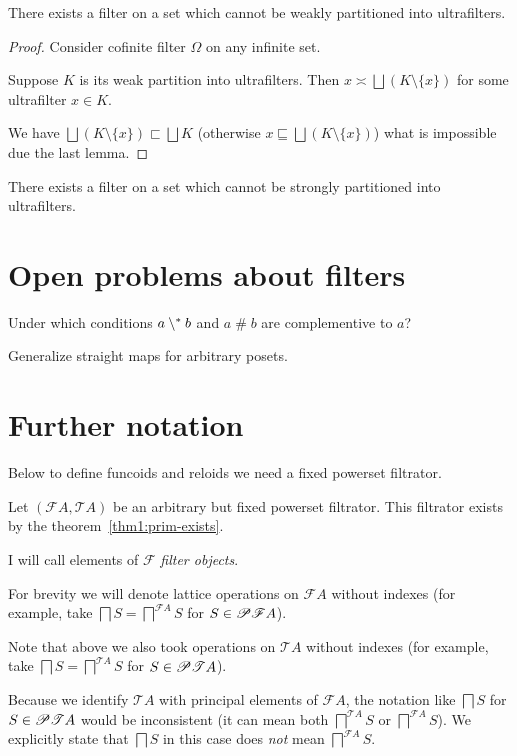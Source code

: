 \begin{example}
There exists a filter on a set which cannot be weakly partitioned
into ultrafilters.\end{example}
\begin{proof}
Consider cofinite filter $\Omega$ on any infinite set.

Suppose $K$ is its weak partition into ultrafilters. Then $x\asymp\bigsqcup(K\setminus\{x\})$
for some ultrafilter $x\in K$.

We have $\bigsqcup(K\setminus\{x\})\sqsubset\bigsqcup K$ (otherwise
$x\sqsubseteq\bigsqcup(K\setminus\{x\})$) what is impossible due
the last lemma.\end{proof}
\begin{cor}
There exists a filter on a set which cannot be strongly partitioned
into ultrafilters.
\end{cor}

\section{Open problems about filters}

Under which conditions $a\setminus^{\ast} b$ and $a\mathop\#b$ are complementive
to $a$?

Generalize straight maps for arbitrary posets.


\section{Further notation}

Below to define funcoids and reloids we need a fixed powerset filtrator.

Let $(\mathscr{F}A,\mathscr{T}A)$ be an arbitrary but fixed powerset
filtrator. This filtrator exists by the theorem~\ref{thm1:prim-exists}.

I will call elements of $\mathscr{F}$ \emph{filter
objects}.

For brevity we will denote lattice operations on $\mathscr{F}A$ without
indexes (for example, take $\bigsqcap S=\bigsqcap^{\mathscr{F}A}S$
for $S\in\mathscr{P}\mathscr{F}A$).

Note that above we also took operations on $\mathscr{T}A$ without
indexes (for example, take $\bigsqcap S=\bigsqcap^{\mathscr{T}A}S$
for $S\in\mathscr{P}\mathscr{T}A$).

Because we identify $\mathscr{T}A$ with principal elements of $\mathscr{F}A$,
the notation like $\bigsqcap S$ for $S\in\mathscr{P}\mathscr{T}A$ would
be inconsistent (it can mean both $\bigsqcap^{\mathscr{T}A}S$ or
$\bigsqcap^{\mathscr{F}A}S$). We explicitly state that $\bigsqcap S$
in this case does \emph{not} mean $\bigsqcap^{\mathscr{F}A}S$.


